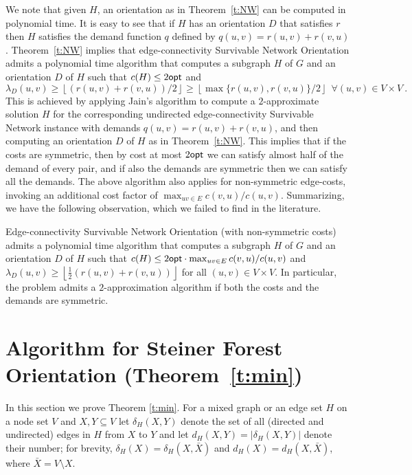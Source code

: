 \documentclass[envcountsame]{llncs}
\begin{document}
We note that given $H$, an orientation as in Theorem~\ref{t:NW} can be computed in polynomial time.
It is easy to see that if $H$ has 
an orientation $D$ that satisfies $r$ then $H$ satisfies the demand function $q$ defined by 
$q(u,v)=r(u,v)+r(v,u)$.
Theorem~\ref{t:NW} implies that edge-connectivity {\sf Survivable Network Orientation} admits 
a polynomial time algorithm that computes a subgraph $H$ of $G$ and an orientation $D$ of $H$
such that $c(H) \leq 2 {\sf opt}$ and  
$$\lambda_D(u,v) \geq \left \lfloor (r(u,v)+r(v,u))/2 \right\rfloor \geq 
\left\lfloor \max\{r(u,v),r(v,u)\}/2 \right\rfloor \ \ \forall (u,v) \in V \times V \ .$$
This is achieved by applying Jain's \cite{Jain} algorithm to compute a 
$2$-approximate solution $H$ for the corresponding undirected 
edge-connectivity {\sf Survivable Network} instance with demands $q(u,v)=r(u,v)+r(v,u)$,
and then computing an orientation $D$ of $H$ as in Theorem~\ref{t:NW}.
This implies that if the costs are symmetric, then by cost at most $2{\sf opt}$
we can satisfy almost half of the demand of every pair, 
and if also the demands are symmetric then we can satisfy all the demands.
The above algorithm also applies for non-symmetric edge-costs, 
invoking an additional cost factor of $\max_{uv \in E} c(v,u)/c(u,v)$.
Summarizing, we have the following observation, which we failed to find in the literature. 

\begin{corollary} \label{c:NW}
Edge-connectivity {\sf Survivable Network Orientation} (with non-sym\-me\-tric costs) admits 
a polynomial time algorithm that computes a subgraph $H$ of $G$ and an orientation $D$ of $H$
such that $c(H) \leq 2 {\sf opt} \cdot \max_{uv \in E} c(v,u)/c(u,v)$ and  
$\lambda_D(u,v) \geq \left \lfloor \frac{1}{2}(r(u,v)+r(v,u))\right\rfloor$ for all $(u,v) \in V \times V$. 
In particular, the problem  admits a $2$-approximation algorithm if both 
the costs and the demands are symmetric.
\end{corollary}



\section{Algorithm for  {\sf Steiner Forest Orientation} (Theorem~\ref{t:min})}

\label{s:min}

In this section we prove Theorem \ref{t:min}. 
For a mixed graph or an edge set $H$ on a node set $V$ and $X,Y \subseteq V$ let
$\delta_H(X,Y)$ denote the set of all (directed and undirected) edges in $H$ from $X$ to $Y$
and let $d_H(X,Y)=|\delta_H(X,Y)|$ denote their number;
for brevity, $\delta_H(X)=\delta_H(X,\bar{X})$ and $d_H(X)=d_H(X,\bar{X})$,
where $\bar{X}=V \setminus X$.
\end{document}
